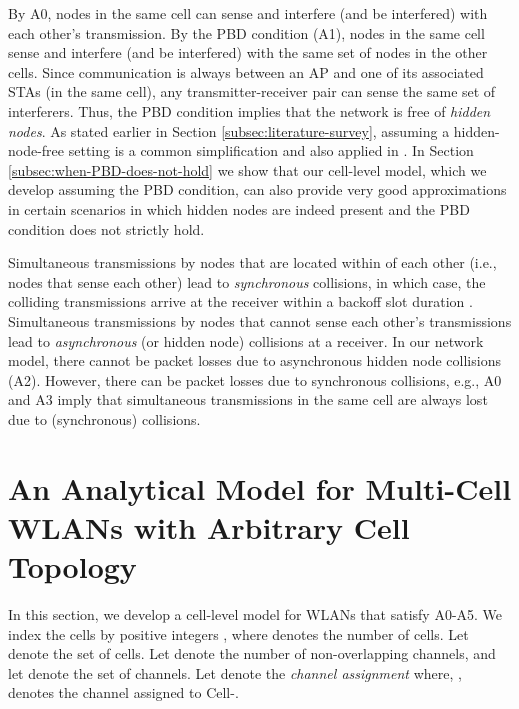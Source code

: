 \documentclass[10pt,a4paper,journal]{IEEEtran}
\theoremstyle{definition}
\theoremstyle{remark}
\theoremstyle{plain}
\begin{document}
By A0, nodes in the same cell can sense and interfere (and be interfered) with each other's transmission. By the PBD condition (A1), nodes in the same cell sense and interfere (and be interfered) with the same set of nodes in the other cells. Since communication is always between an AP and one of its associated STAs (in the same cell), any transmitter-receiver pair can sense the same set of interferers. Thus, the PBD condition implies that the network is free of \textit{hidden nodes}. As stated earlier in Section \ref{subsec:literature-survey}, assuming a hidden-node-free setting is a common simplification and also applied in \cite{wanet.durvy09selfOrganization,wanet.bonald08multicellprocsharing,wanet.jiang-liew08MobComp-HNEN,wanet.liew_etal09mobicom-capacity-wireless-networks,wanet.liew_etal09ICCback-of-the-envelope}. In Section \ref{subsec:when-PBD-does-not-hold} we show that our cell-level model, which we develop assuming the PBD condition, can also provide very good approximations in certain scenarios in which hidden nodes are indeed present and the PBD condition does not strictly hold. 

Simultaneous transmissions by nodes that are located within  of each other (i.e., nodes that sense each other) lead to \textit{synchronous} collisions, in which case, the colliding transmissions arrive at the receiver within a backoff slot duration \cite{wanet.roy_etal09ToN-PCS}. Simultaneous transmissions by nodes that cannot sense each other's transmissions lead to \textit{asynchronous} (or hidden node) collisions at a receiver. In our network model, there cannot be packet losses due to asynchronous hidden node collisions (A2). However, there can be packet losses due to synchronous collisions, e.g., A0 and A3 imply that simultaneous transmissions in the same cell are always lost due to (synchronous) collisions. 



\section{An Analytical Model for Multi-Cell WLANs with Arbitrary Cell Topology}
\label{sec:analysis-multicell-arbitrary-cell-topology}



In this section, we develop a cell-level model for WLANs that satisfy A0-A5. We index the cells by positive integers , where  denotes the number of cells. Let  denote the set of cells. Let  denote the number of non-overlapping channels, and let  denote the set of channels. Let  denote the \textit{channel assignment} where, ,  denotes the channel assigned to Cell-. 
\end{document}
